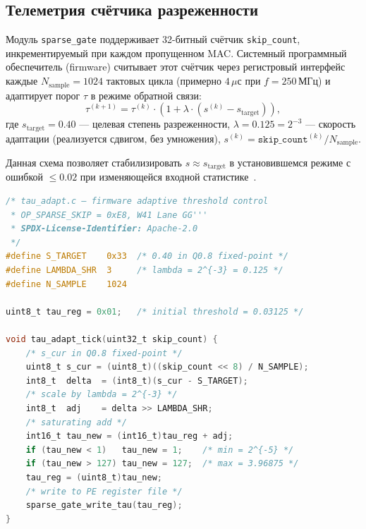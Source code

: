 \subsection{Телеметрия счётчика разреженности}
\label{ssec:glava87-telemetry}

Модуль \texttt{sparse\_gate} поддерживает 32-битный счётчик
\texttt{skip\_count}, инкрементируемый при каждом пропущенном MAC.
Системный программный обеспечитель (firmware) считывает этот счётчик
через регистровый интерфейс каждые $N_{\text{sample}} = 1024$
тактовых цикла (примерно $4\,\mu\text{с}$ при $f = 250\,\text{МГц}$)
и адаптирует порог $\tau$ в режиме обратной связи:
\begin{equation}
  \tau^{(k+1)} = \tau^{(k)} \cdot
  \left(1 + \lambda \cdot \left(s^{(k)} - s_{\text{target}}\right)\right),
  \label{eq:tau-adapt}
\end{equation}
где $s_{\text{target}} = 0{.}40$ — целевая степень разреженности,
$\lambda = 0{.}125 = 2^{-3}$ — скорость адаптации (реализуется
сдвигом, без умножения), $s^{(k)} = \texttt{skip\_count}^{(k)} /
N_{\text{sample}}$.

Данная схема позволяет стабилизировать $s \approx s_{\text{target}}$
в установившемся режиме с ошибкой $\leq 0{.}02$ при изменяющейся
входной статистике~\cite{koren2024sparsity}.

\begin{lstlisting}[language=C,
  caption={Псевдокод адаптивной настройки порога $\tau$ в firmware},
  label={lst:tau-adapt}]
/* tau_adapt.c — firmware adaptive threshold control
 * OP_SPARSE_SKIP = 0xE8, W41 Lane GG'''
 * SPDX-License-Identifier: Apache-2.0
 */
#define S_TARGET    0x33  /* 0.40 in Q0.8 fixed-point */
#define LAMBDA_SHR  3     /* lambda = 2^{-3} = 0.125 */
#define N_SAMPLE    1024

uint8_t tau_reg = 0x01;   /* initial threshold = 0.03125 */

void tau_adapt_tick(uint32_t skip_count) {
    /* s_cur in Q0.8 fixed-point */
    uint8_t s_cur = (uint8_t)((skip_count << 8) / N_SAMPLE);
    int8_t  delta  = (int8_t)(s_cur - S_TARGET);
    /* scale by lambda = 2^{-3} */
    int8_t  adj    = delta >> LAMBDA_SHR;
    /* saturating add */
    int16_t tau_new = (int16_t)tau_reg + adj;
    if (tau_new < 1)   tau_new = 1;    /* min = 2^{-5} */
    if (tau_new > 127) tau_new = 127;  /* max = 3.96875 */
    tau_reg = (uint8_t)tau_new;
    /* write to PE register file */
    sparse_gate_write_tau(tau_reg);
}
\end{lstlisting}

